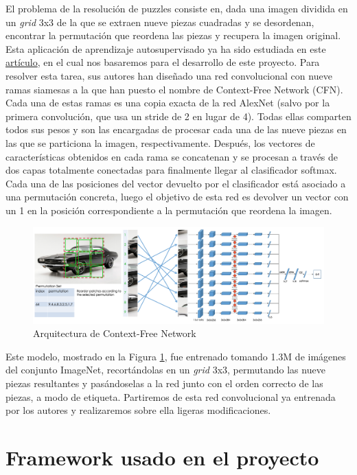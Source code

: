 \documentclass[10pt,a4paper]{article}
\begin{document}
El problema de la resolución de puzzles consiste en, dada una imagen dividida en un \textit{grid} 3x3 de la que se extraen nueve piezas cuadradas y se desordenan, encontrar la permutación que reordena las piezas y recupera la imagen original. Esta aplicación de aprendizaje autosupervisado ya ha sido estudiada en este \href{https://arxiv.org/pdf/1603.09246v3.pdf}{artículo}, en el cual nos basaremos para el desarrollo de este proyecto. Para resolver esta tarea, sus autores han diseñado una red convolucional con nueve ramas siamesas a la que han puesto el nombre de Context-Free Network (CFN). Cada una de estas ramas es una copia exacta de la red AlexNet (salvo por la primera convolución, que usa un stride de 2 en lugar de 4). Todas ellas comparten todos sus pesos y son las encargadas de procesar cada una de las nueve piezas en las que se particiona la imagen, respectivamente. Después, los vectores de características obtenidos en cada rama se concatenan y se procesan a través de dos capas totalmente conectadas para finalmente llegar al clasificador softmax. Cada una de las posiciones del vector devuelto por el clasificador está asociado a una permutación concreta, luego el objetivo de esta red es devolver un vector con un 1 en la posición correspondiente a la permutación que reordena la imagen.

\begin{figure}[h]
	\includegraphics[width=\textwidth]{arquitectura_cfn}
	\caption{Arquitectura de Context-Free Network}
	\label{fig:arquitectura_cfn}
\end{figure}

Este modelo, mostrado en la Figura \ref{fig:arquitectura_cfn}, fue entrenado tomando 1.3M de imágenes del conjunto ImageNet, recortándolas en un \textit{grid} 3x3, permutando las nueve piezas resultantes y pasándoselas a la red junto con el orden correcto de las piezas, a modo de etiqueta. Partiremos de esta red convolucional ya entrenada por los autores y realizaremos sobre ella ligeras modificaciones.




\newpage
\section{Framework usado en el proyecto}
\end{document}
